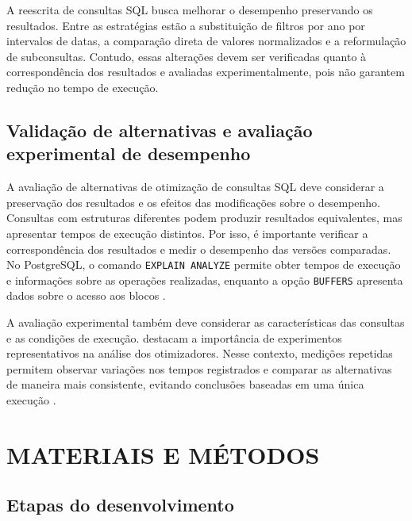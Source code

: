 \documentclass{UNESC}
\newcommand{\codigo}[1]{\texttt{#1}}
\begin{document}
A reescrita de consultas SQL busca melhorar o desempenho preservando os resultados. Entre as estratégias estão a substituição de filtros por ano por intervalos de datas, a comparação direta de valores normalizados e a reformulação de subconsultas. Contudo, essas alterações devem ser verificadas quanto à correspondência dos resultados e avaliadas experimentalmente, pois não garantem redução no tempo de execução.



\subsection{Validação de alternativas e avaliação experimental de desempenho}

A avaliação de alternativas de otimização de consultas SQL deve considerar a preservação dos resultados e os efeitos das modificações sobre o desempenho. Consultas com estruturas diferentes podem produzir resultados equivalentes, mas apresentar tempos de execução distintos. Por isso, é importante verificar a correspondência dos resultados e medir o desempenho das versões comparadas. No PostgreSQL, o comando \codigo{EXPLAIN ANALYZE} permite obter tempos de execução e informações sobre as operações realizadas, enquanto a opção \codigo{BUFFERS} apresenta dados sobre o acesso aos blocos \cite{kostov2026rewrites,postgresql2026explain}.

A avaliação experimental também deve considerar as características das consultas e as condições de execução.  destacam a importância de experimentos representativos na análise dos otimizadores. Nesse contexto, medições repetidas permitem observar variações nos tempos registrados e comparar as alternativas de maneira mais consistente, evitando conclusões baseadas em uma única execução \cite{kostov2026rewrites}.






\section{MATERIAIS E MÉTODOS}

\subsection{Etapas do desenvolvimento}
\end{document}
